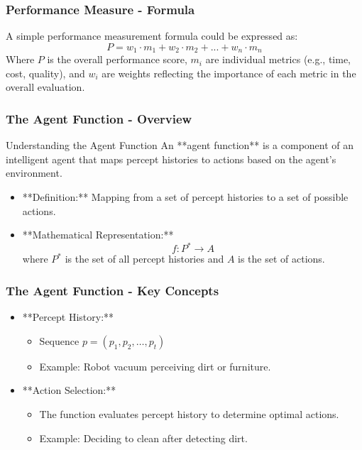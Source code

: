 \documentclass[aspectratio=169]{beamer}
\begin{document}
\begin{frame}[fragile]
    \frametitle{Performance Measure - Formula}
    A simple performance measurement formula could be expressed as:
    \begin{equation}
        P = w_1 \cdot m_1 + w_2 \cdot m_2 + ... + w_n \cdot m_n
    \end{equation}
    Where \( P \) is the overall performance score, \( m_i \) are individual metrics (e.g., time, cost, quality), and \( w_i \) are weights reflecting the importance of each metric in the overall evaluation.
\end{frame}

\begin{frame}[fragile]
    \frametitle{The Agent Function - Overview}
    \begin{block}{Understanding the Agent Function}
        An **agent function** is a component of an intelligent agent that maps percept histories to actions based on the agent's environment.
    \end{block}
    \begin{itemize}
        \item **Definition:** Mapping from a set of percept histories to a set of possible actions.
        \item **Mathematical Representation:** 
        \[
        f: P^* \rightarrow A
        \]
        where \( P^* \) is the set of all percept histories and \( A \) is the set of actions.
    \end{itemize}
\end{frame}

\begin{frame}[fragile]
    \frametitle{The Agent Function - Key Concepts}
    \begin{itemize}
        \item **Percept History:**
            \begin{itemize}
                \item Sequence \( p = (p_1, p_2, \ldots, p_t) \)
                \item Example: Robot vacuum perceiving dirt or furniture.
            \end{itemize}
        \item **Action Selection:**
            \begin{itemize}
                \item The function evaluates percept history to determine optimal actions.
                \item Example: Deciding to clean after detecting dirt.
            \end{itemize}
    \end{itemize}
\end{frame}
\end{document}
